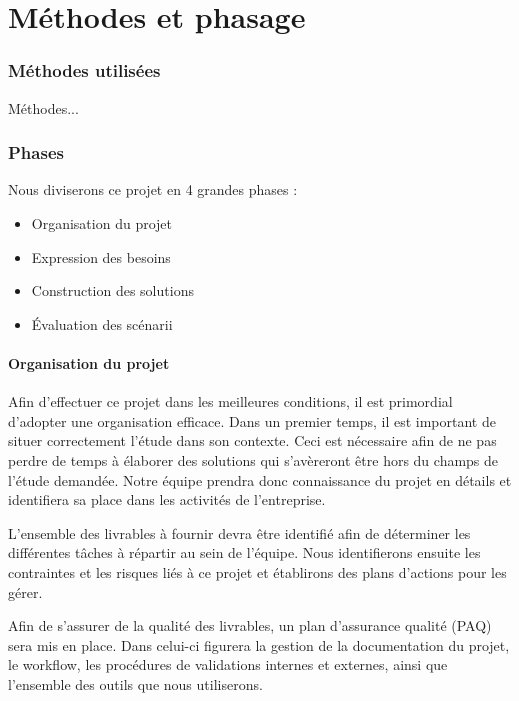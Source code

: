 \chapter*{M\'ethodes et phasage}

\subsection*{M\'ethodes utilis\'ees}


M\'ethodes...

\subsection*{Phases}

Nous diviserons ce projet en 4 grandes phases :


\begin{itemize}
 \item Organisation du projet
 \item Expression des besoins
 \item Construction des solutions
 \item \'Evaluation des sc\'enarii
\end{itemize}


\subsubsection*{Organisation du projet}

Afin d'effectuer ce projet dans les meilleures conditions, il est primordial d'adopter une organisation efficace.
Dans un premier temps, il est important de situer correctement l'\'etude dans son contexte. 
Ceci est n\'ecessaire afin de ne pas perdre de temps \`a \'elaborer des solutions qui s'av\`ereront \^etre hors du champs de l'\'etude demand\'ee.
Notre \'equipe prendra donc connaissance du projet en détails et identifiera sa place dans les activit\'es de l'entreprise.

L'ensemble des livrables \`a fournir devra \^etre identifi\'e afin de d\'eterminer les diff\'erentes t\^aches \`a r\'epartir au sein de l'\'equipe.
Nous identifierons ensuite les contraintes et les risques li\'es \`a ce projet et \'etablirons des plans d'actions pour les g\'erer.

Afin de s'assurer de la qualit\'e des livrables, un plan d'assurance qualit\'e (PAQ) sera mis en place. Dans celui-ci figurera la gestion de la documentation du projet,
le workflow, les proc\'edures de validations internes et externes, ainsi que l'ensemble des outils que nous utiliserons.

